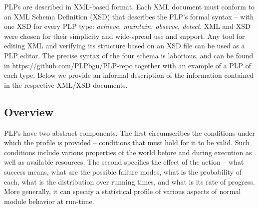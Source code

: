 \documentclass[ 5p, 12pt, times, twocolumn, sort&compress ]{elsarticle}
\newcommand\mNote[1]{\todo[inline, author=Michael, color=cyan]{#1}}
\newcommand\rNote[1]{\todo[inline, author=Ronen, color=yellow]{#1}}
\begin{document}
PLPs are described in XML-based format. Each XML document must conform to an XML Schema Definition (XSD) that describes the PLP's formal syntax -- with
one XSD for every PLP type: {\em achieve, maintain, observe, detect}. XML and XSD were chosen for their simplicity and wide-spread use and support. Any tool for editing XML and verifying its structure based on an XSD file can be used as a PLP editor. The precise syntax of the four schema
is laborious, and can be found in https://github.com/PLPbgu/PLP-repo together with an example of a PLP of each type. Below we provide an informal description of the information contained in the respective XML/XSD documents.

\subsection{Overview}
PLPs have two abstract components. The first circumscribes the conditions under which the profile is provided -- conditions that must hold for it to be valid. Such conditions include various properties of the world before and during execution
as well as available resources. The second specifies the effect of the action -- what success means, what are the possible failure modes, what is the probability of each, what is the distribution over running times, and what is its rate of progress. More generally, it can specify a statistical profile of various aspects of normal module behavior at run-time. 
\end{document}
